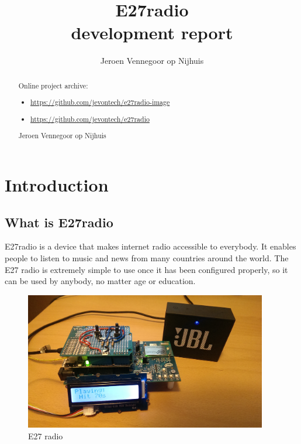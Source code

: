 \documentclass[12pt,a4paper]{scrreprt}
\author{Jeroen Vennegoor op Nijhuis}
\title{E27radio \\ development report}
\begin{document}
\maketitle

\begin{abstract}
Online project archive: 

\begin{itemize}
	\item \url{https://github.com/jevontech/e27radio-image}\\
	\item \url{https://github.com/jevontech/e27radio}\\

\end{itemize}

\begin{center}
 Jeroen Vennegoor op Nijhuis
\end{center}


\end{abstract}

\tableofcontents

\chapter{Introduction}


\section{What is E27radio}
E27radio is a device that makes internet radio accessible to everybody. It enables people  to listen to music and news from many countries around the world. The E27 radio is extremely simple to use once it has been configured properly, so it can be used by anybody, no matter age or education. 
\begin{figure}[h]
	\includegraphics[width=400px]{images/overview}
	\caption{E27 radio}
\end{figure}
\end{document}
